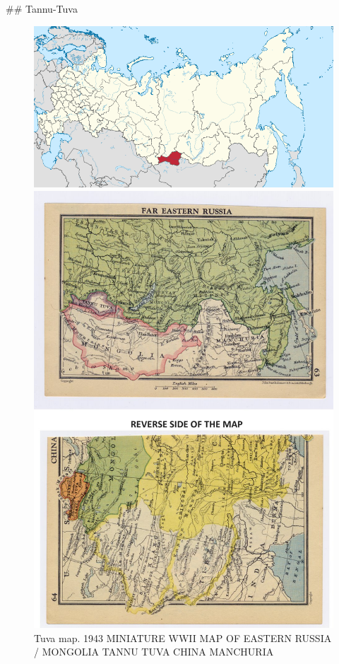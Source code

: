 \#\# Tannu-Tuva

\begin{fullwidth}
\begin{figure}[htp]
\includegraphics[width=.95\textwidth]{../tannu-tuva/tuva-map.png}

\includegraphics[width=.95\textwidth]{../tannu-tuva/tannu-tuva-map.jpg}
\caption{Tuva map. 1943 MINIATURE WWII MAP OF EASTERN RUSSIA / MONGOLIA TANNU TUVA CHINA MANCHURIA }
\end{figure}
\end{fullwidth}






                                                          